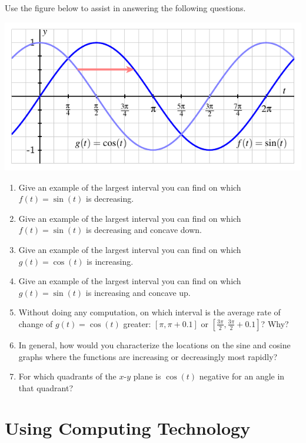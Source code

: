 \documentclass[nooutcomes]{ximera}
\begin{document}
\begin{exploration}
Use the figure below to assist in answering the following questions.
\begin{image}
\includegraphics{sine-and-cosine-graphs.pdf}
\end{image}

\begin{enumerate}[label=\alph*.]
\item
Give an example of the largest interval you can find on which \(f(t) = \sin(t)\) is decreasing.%
\item
Give an example of the largest interval you can find on which \(f(t) = \sin(t)\) is decreasing and concave down.%
\item
Give an example of the largest interval you can find on which \(g(t) = \cos(t)\) is increasing.%
\item
Give an example of the largest interval you can find on which \(g(t) = \sin(t)\) is increasing and concave up.%
\item
Without doing any computation, on which interval is the average rate of change of \(g(t) = \cos(t)\) greater:  \(\left[\pi, \pi+0.1\right]\) or \(\left[\frac{3\pi}{2}, \frac{3\pi}{2} + 0.1\right]\)?  Why?%
\item
In general, how would you characterize the locations on the sine and cosine graphs where the functions are increasing or decreasingly most rapidly?%
\item
For which quadrants of the \(x\)-\(y\) plane is \(\cos(t)\) negative for an angle in that quadrant?%
\end{enumerate}

\end{exploration}


\section{Using Computing Technology}
\end{document}
